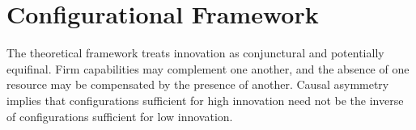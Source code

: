 \section{Configurational Framework}

The theoretical framework treats innovation as conjunctural and potentially
equifinal. Firm capabilities may complement one another, and the absence of one
resource may be compensated by the presence of another. Causal asymmetry implies
that configurations sufficient for high innovation need not be the inverse of
configurations sufficient for low innovation.
